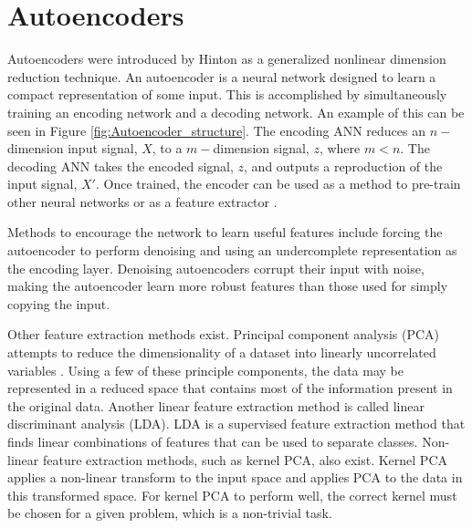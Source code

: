 \section{Autoencoders} \label{Autoencoders}

Autoencoders were introduced by Hinton \cite{Hinton2006} as a generalized nonlinear dimension reduction technique. An autoencoder is a neural network designed to learn a compact representation of some input. This is accomplished by simultaneously training an encoding network and a decoding network. An example of this can be seen in Figure \ref{fig:Autoencoder_structure}. The encoding ANN reduces an $n-$dimension input signal, $X$, to a $m-$dimension signal, $z$, where $m < n$. The decoding ANN takes the encoded signal, $z$, and outputs a reproduction of the input signal, $X'$. Once trained, the encoder can be used as a method to pre-train other neural networks or as a feature extractor \cite{Erhan2010,CHARTE2018}. 

Methods to encourage the network to learn useful features include forcing the autoencoder to perform denoising \cite{Vincent2008, Vincent2010} and using an undercomplete representation as the encoding layer. Denoising autoencoders corrupt their input with noise, making the autoencoder learn more robust features than those used for simply copying the input. 


Other feature extraction methods exist. Principal component analysis (PCA) attempts to reduce the dimensionality of a dataset into linearly uncorrelated variables \cite{Jolliffe2002}. Using a few of these principle components, the data may be represented in a reduced space that contains most of the information present in the original data. Another linear feature extraction method is called linear discriminant analysis (LDA). LDA is a supervised feature extraction method that finds linear combinations of features that can be used to separate classes. Non-linear feature extraction methods, such as kernel PCA, also exist. Kernel PCA applies a non-linear transform to the input space and applies PCA to the data in this transformed space. For kernel PCA to perform well, the correct kernel must be chosen for a given problem, which is a non-trivial task.




